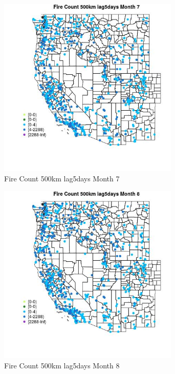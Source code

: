 \begin{figure} 
\centering  
\includegraphics[width=0.77\textwidth]{Code_Outputs/Report_ML_input_PM25_Step4_part_e_de_duplicated_aves_compiled_2019-05-21wNAs_MapObsMo7Fire_Count_500km_lag5days.jpg} 
\caption{\label{fig:Report_ML_input_PM25_Step4_part_e_de_duplicated_aves_compiled_2019-05-21wNAsMapObsMo7Fire_Count_500km_lag5days}Fire Count 500km lag5days Month 7} 
\end{figure} 
 

\begin{figure} 
\centering  
\includegraphics[width=0.77\textwidth]{Code_Outputs/Report_ML_input_PM25_Step4_part_e_de_duplicated_aves_compiled_2019-05-21wNAs_MapObsMo8Fire_Count_500km_lag5days.jpg} 
\caption{\label{fig:Report_ML_input_PM25_Step4_part_e_de_duplicated_aves_compiled_2019-05-21wNAsMapObsMo8Fire_Count_500km_lag5days}Fire Count 500km lag5days Month 8} 
\end{figure} 
 

